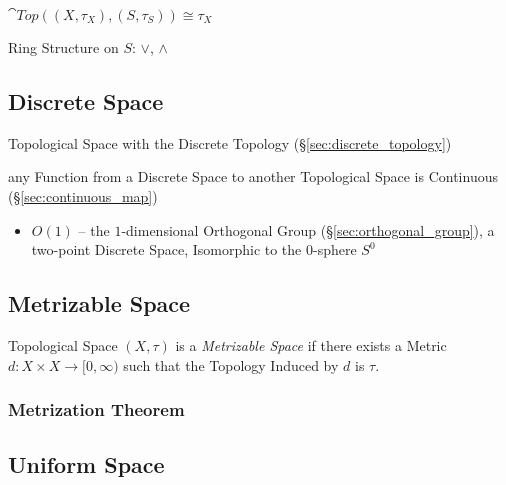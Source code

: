 $\cat{Top}((X,\tau_X),(S,\tau_S)) \cong \tau_X$

Ring Structure on $S$: $\vee$, $\wedge$



\subsection{Discrete Space}\label{sec:discrete_space}

Topological Space with the Discrete Topology (\S\ref{sec:discrete_topology})

any Function from a Discrete Space to another Topological Space is Continuous
(\S\ref{sec:continuous_map})

\begin{itemize}
  \item $O(1)$ -- the $1$-dimensional Orthogonal Group
    (\S\ref{sec:orthogonal_group}), a two-point Discrete Space, Isomorphic to
    the $0$-sphere $S^0$
\end{itemize}



\subsection{Metrizable Space}\label{sec:metrizable_space}

Topological Space $(X, \tau)$ is a \emph{Metrizable Space} if there
exists a Metric $d : X \times X \rightarrow [0, \infty)$ such that the
  Topology Induced by $d$ is $\tau$.



\subsubsection{Metrization Theorem}\label{sec:metrization_theorem}



\subsection{Uniform Space}\label{sec:uniform_space}

